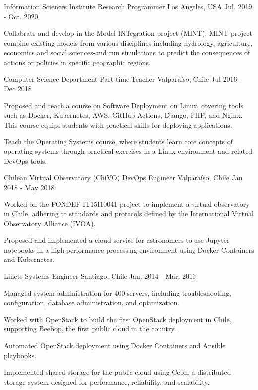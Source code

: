 \begin{cventries}
  \cventry
    {Information Sciences Institute}
    {Research Programmer}
    {Los Angeles, USA}
    {Jul. 2019 - Oct. 2020}
    {
      \begin{cvitems}
        \item{Collabrate and develop in the Model INTegration project (MINT), MINT project combine existing models from various disciplines-including hydrology, agriculture, economics and social sciences-and run simulations to predict the consequences of actions or policies in specific geographic regions.}
      \end{cvitems}
    }

    \cventry
    {Computer Science Department}
    {Part-time Teacher}
    {Valparaíso, Chile}
    {Jul 2016 - Dec 2018}
    {
      \begin{cvitems}
        \item{Proposed and teach a course on Software Deployment on Linux, covering tools such as Docker, Kubernetes, AWS, GitHub Actions, Django, PHP, and Nginx. This course equips students with practical skills for deploying applications.}
        \item{Teach the Operating Systems course, where students learn core concepts of operating systems through practical exercises in a Linux environment and related DevOps tools.}
      \end{cvitems}
    }

  \cventry
  {Chilean Virtual Observatory (ChiVO)}
  {DevOps Engineer}
  {Valparaíso, Chile}
  {Jan 2018 - May 2018}
  {
    \begin{cvitems}
      \item{Worked on the FONDEF IT15I10041 project to implement a virtual observatory in Chile, adhering to standards and protocols defined by the International Virtual Observatory Alliance (IVOA).}
      \item{Proposed and implemented a cloud service for astronomers to use Jupyter notebooks in a high-performance processing environment using Docker Containers and Kubernetes.}
    \end{cvitems}
  }

  \cventry
    {Linets}
    {Systems Engineer}
    {Santiago, Chile}
    {Jan. 2014 - Mar. 2016}
    {
      \begin{cvitems}
        \item{Managed system administration for 400 servers, including troubleshooting, configuration, database administration, and optimization.}
        \item{Worked with OpenStack to build the first OpenStack deployment in Chile, supporting Beebop, the first public cloud in the country.}
        \item{Automated OpenStack deployment using Docker Containers and Ansible playbooks.}
        \item{Implemented shared storage for the public cloud using Ceph, a distributed storage system designed for performance, reliability, and scalability.}
      \end{cvitems}
    }


\end{cventries}
